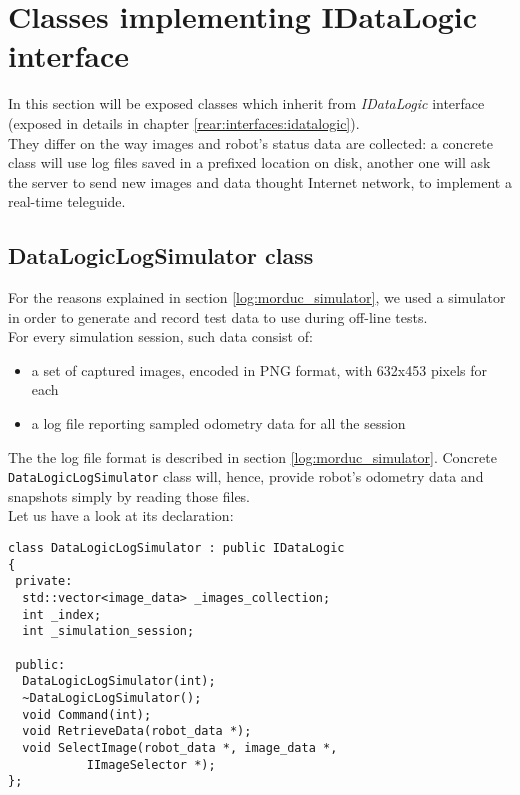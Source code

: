 \section{Classes implementing IDataLogic interface}
\label{concr:idatalogic}

In this section will be exposed classes which inherit
from \textit{IDataLogic} interface (exposed in details
in chapter \ref{rear:interfaces:idatalogic}).
\\
They differ on the way images
and robot's status data are collected: a concrete class
will use log files saved in a prefixed location on disk,
another one will ask the server to send new images and data
thought Internet network, to implement a real-time teleguide.

\subsection{DataLogicLogSimulator class}
\label{concr:idatalogic:datalogiclogsimulator}

For the reasons explained in section \ref{log:morduc_simulator},
we used a \morduc{} simulator in order to generate and record 
test data to use during off-line tests.
\\
For every simulation session, such data consist of:

\begin{itemize}
  \item a set of captured images, encoded in PNG format,
    with 632x453 pixels for each
  \item a log file reporting sampled odometry data
    for all the session
\end{itemize}

The the log file format is described in section 
\ref{log:morduc_simulator}.
Concrete \texttt{DataLogicLogSimulator} class will, hence, provide 
robot's odometry data and snapshots simply by reading 
those files.
\\
Let us have a look at its declaration:
\\
\begin{lstlisting}[caption={\texttt{DataLogicLogSimulator} declaration},
    label={code:datalogiclogsimulator:declaration}]
class DataLogicLogSimulator : public IDataLogic
{
 private:
  std::vector<image_data> _images_collection;
  int _index;
  int _simulation_session;
  
 public:
  DataLogicLogSimulator(int);
  ~DataLogicLogSimulator();
  void Command(int);
  void RetrieveData(robot_data *);
  void SelectImage(robot_data *, image_data *,
		   IImageSelector *);
};
\end{lstlisting}

